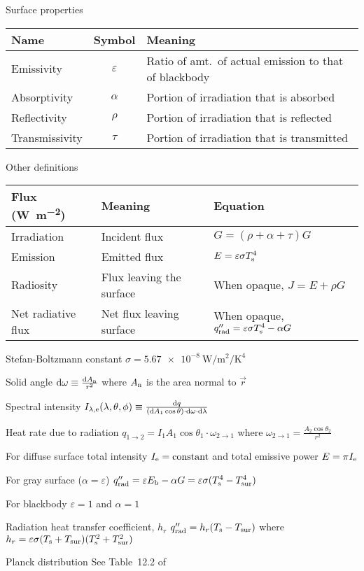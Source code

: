 \documentclass{article}
\begin{document}
\begin{description*}
  \item[Surface properties]
    \begin{tabu}{lcl}
      \toprule
      Name & Symbol & Meaning \\
      \midrule
      Emissivity & $\varepsilon$ & Ratio of amt.\ of actual emission to that of blackbody \\
      Absorptivity & $\alpha$ & Portion of irradiation that is absorbed \\
      Reflectivity & $\rho$ & Portion of irradiation that is reflected \\
      Transmissivity & $\tau$ & Portion of irradiation that is transmitted \\
      \bottomrule
    \end{tabu}
  \item[Other definitions]
    \begin{tabu}{lll}
      \toprule
      Flux (\si{\watt\per\square\meter}) & Meaning & Equation \\
      \midrule
      Irradiation & Incident flux & \(G = (\rho+\alpha+\tau)G\) \\
      Emission & Emitted flux & \(E = \varepsilon\sigma{}T^4_{\mathrm{s}}\) \\
      Radiosity & Flux leaving the surface & When opaque, \(J = E + \rho{}G\)\\
      Net radiative flux & Net flux leaving surface & When opaque,
      \(q''_{\mathrm{rad}} = \varepsilon\sigma{}T^4_{\mathrm{s}}-\alpha{}G\) \\
      \bottomrule
    \end{tabu}
  \item[Stefan-Boltzmann constant]
    \(\sigma = \SI{5.67e-8}{\watt\per\square\meter\per\kelvin\tothe{4}}\)
  \item[Solid angle]
    \(\dif{\omega} \equiv \frac{\dif{A_\mrm{n}}}{r^2}\) where
    $A_{\mathrm{n}}$ is the area normal to $\vec{r}$
  \item[Spectral intensity]
    \(I_{\lambda,\mrm{e}}(\lambda,\theta,\phi)
    \equiv \frac{\dif q}{(\dif{A_1}\cos\theta)\cdot\dif{\omega}\cdot\dif{\lambda}}\)
  \item[Heat rate due to radiation]
    \(q_{1\rightarrow2} = I_1A_1\cos\theta_1 \cdot \omega_{2\rightarrow1}\) where
    \(\omega_{2\rightarrow1} = \frac{A_2\cos\theta_2}{r^2}\)
  \item[For diffuse surface]
    total intensity \(I_{\mathrm{e}} = \textrm{constant}\) and
    total emissive power \(E = \pi{}I_{\mathrm{e}}\)
  \item[For gray surface ($\alpha=\varepsilon$)]
    \(q''_{\mathrm{rad}} = \varepsilon E_{\mathrm{b}} - \alpha G
    = \varepsilon\sigma(T_{\mathrm{s}}^4-T_{\mathrm{sur}}^4)\)
  \item[For blackbody] $\varepsilon=1$ and $\alpha=1$
  \item[Radiation heat transfer coefficient, $h_r$]
    \(q''_{\mathrm{rad}} = h_r(T_{\mathrm{s}}-T_{\mathrm{sur}})\) where
    \(h_r = \varepsilon\sigma(T_{\mathrm{s}}+T_{\mathrm{sur}})(T_{\mathrm{s}}^2+T_{\mathrm{sur}}^2)\)
  \item[Planck distribution] See Table~12.2 of~\cite{hamt}
\end{description*}
\end{document}
